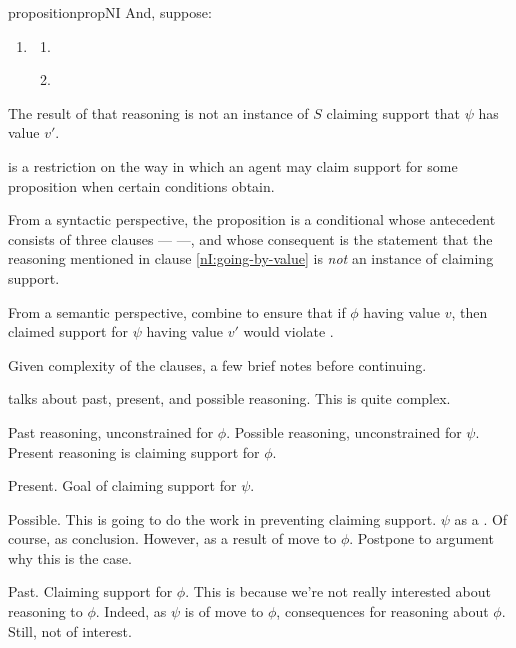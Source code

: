 \begin{note}[\nI{}]
\begin{restatable}[\nI{-}  --- \nI{}]{proposition}{propNI}
    And, suppose:
    \begin{enumerate}[ref=\named{\nIacro{}:\arabic*}, resume*=nI_counter]
    \item\label{nI:going-by-value} \nIClauseValue{}
      \begin{enumerate}[label=\alph*., ref=\named{\nIacro{}3:\alph*}]
      \item\label{nI:going-by-value:phi} \nIClauseValuePhi{}
      \item\label{nI:goingbyvalue:psi} \nIClauseValuePsi{}
      \end{enumerate}
    \end{enumerate}
    The result of that reasoning is not an instance of \(S\) claiming support that \(\psi\) has value \(v'\).
  \end{restatable}
\end{note}

\begin{note}
  \nI{} is a restriction on the way in which an agent may claim support for some proposition when certain conditions obtain.

  From a syntactic perspective, the proposition is a conditional whose antecedent consists of three clauses --- \nIBackground{} ---, and whose consequent is the statement that the reasoning mentioned in clause \ref{nI:going-by-value} is \emph{not} an instance of claiming support.

  From a semantic perspective, \nIBackground{} combine to ensure that if \(\phi\) having value \(v\), then claimed support for \(\psi\) having value \(v'\) would violate \eiS{}.
\end{note}


\begin{note}
  Given complexity of the clauses, a few brief notes before continuing.
\end{note}

\begin{note}[`Reasoning']
  \nI{} talks about past, present, and possible reasoning.
  This is quite complex.

  Past reasoning, unconstrained for \(\phi\).
  Possible reasoning, unconstrained for \(\psi\).
  Present reasoning is claiming support for \(\phi\).

  Present.
  Goal of claiming support for \(\psi\).

  Possible.
  This is going to do the work in preventing claiming support.
  \(\psi\) as a \requ{}.
  Of course, as conclusion.
  However, as a result of move to \(\phi\).
  Postpone to argument why this is the case.

  Past.
  Claiming support for \(\phi\).
  This is because we're not really interested about reasoning to \(\phi\).
  Indeed, as \(\psi\) is \requ{} of move to \(\phi\), consequences for reasoning about \(\phi\).
  Still, not of interest.
\end{note}

